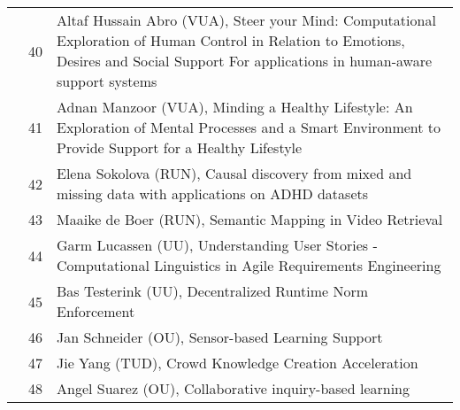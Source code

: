 \begin{xltabular}{\linewidth}{@{} l @{\hspace{0.5em}} l @{\hspace{1em}} X @{}}
	&	 40	&	 Altaf Hussain Abro (VUA), Steer your Mind: Computational Exploration of Human Control in Relation to Emotions, Desires and Social Support For applications in human-aware support systems \\
	&	 41	&	 Adnan Manzoor (VUA), Minding a Healthy Lifestyle: An Exploration of Mental Processes and a Smart Environment to Provide Support for a Healthy Lifestyle\\
	&	 42	&	 Elena Sokolova (RUN), Causal discovery from mixed and missing data with applications on ADHD  datasets\\
	&	 43	&	 Maaike de Boer (RUN), Semantic Mapping in Video Retrieval\\
	&	 44	&	 Garm Lucassen (UU), Understanding User Stories - Computational Linguistics in Agile Requirements Engineering\\
	&	 45	&	 Bas Testerink	(UU), Decentralized Runtime Norm Enforcement\\
	&	 46	&	 Jan Schneider	(OU), Sensor-based Learning Support\\
	&	 47	&	 Jie Yang (TUD), Crowd Knowledge Creation Acceleration\\
	&	 48	&	 Angel Suarez (OU), Collaborative inquiry-based learning\\


\end{xltabular}
